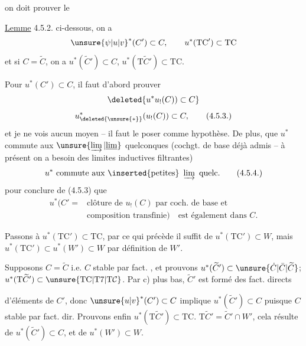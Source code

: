 on doit prouver le

\margin{$\vert$}\uline{Lemme} 4.5.2.   ci-dessous, on a
\[
\unsure{\psi|u|v}^*(C')\subset C,\qquad u^*(\mathrm{TC}')\subset\mathrm{TC}
\]
\margin{$\vert$}et si $C=\widetilde C$, on a $u^*(\widetilde C')\subset C$, $u^*(\mathrm{T}\widetilde C')\subset\mathrm{TC}$.


Pour $u^*(C')\subset C$, il faut d'abord prouver
\[
\deleted{u^*u_!(C))\subset C}
\]
\[
u_{\deleted{\unsure{*}}}^{*}(u_!(C))\subset C,\tag*{(4.5.3.)}
\]
et je ne vois aucun moyen -- il faut le poser comme hypothèse. De plus, que $u^*$ commute aux $\unsure{\varinjlim|\underline{\lim}}$ quelconques (cochgt. de base déjà  admis -- à présent on a besoin des limites inductives filtrantes)
\[
u^*\ \text{commute aux }\text{\inserted{petites}}\ \varinjlim\ \text{quelc.}\tag*{(4.5.4.)}
\]
pour conclure de (4.5.3) que
\[
\begin{aligned}
u^*(C'={}&\text{clôture de }u_!(C)\text{ par coch. de base et}\\ &\text{composition transfinie})\quad\text{est également dans }C.
\end{aligned}
\]

Passons à $u^*(\mathrm{TC}')\subset\mathrm{TC}$, par ce qui précède  il suffit de  $u^*(\mathrm{TC}')\subset W$, mais $u^*(\mathrm{TC}')\subset u^*(W')\subset W$ par définition de $W'$.

Supposons $C=\widetilde C$ i.e. $C$ stable par fact. , et prouvons $u^*(\widetilde C')\subset\unsure{\dot C|\bar C|\widetilde C}$; $u^*(\mathrm{T}\widetilde C')\subset\unsure{\mathrm{TC}|\mathrm{T}7|\mathrm{T}\mathcal C}$. Par c) plus bas, $\widetilde C'$ est formé des fact. directs

d'éléments de $C'$, donc $\unsure{u|v}^*(C')\subset C$ implique $u^*(\widetilde C')\subset C$ puisque $C$ stable par fact. dir. Prouvons enfin $u^*(\mathrm{T}\widetilde C')\subset\mathrm{TC}$.  $\mathrm{T}\widetilde C'=\widetilde C'\cap W'$, cela résulte de $u^*(\widetilde C')\subset C$, et de $u^*(W')\subset W$.

